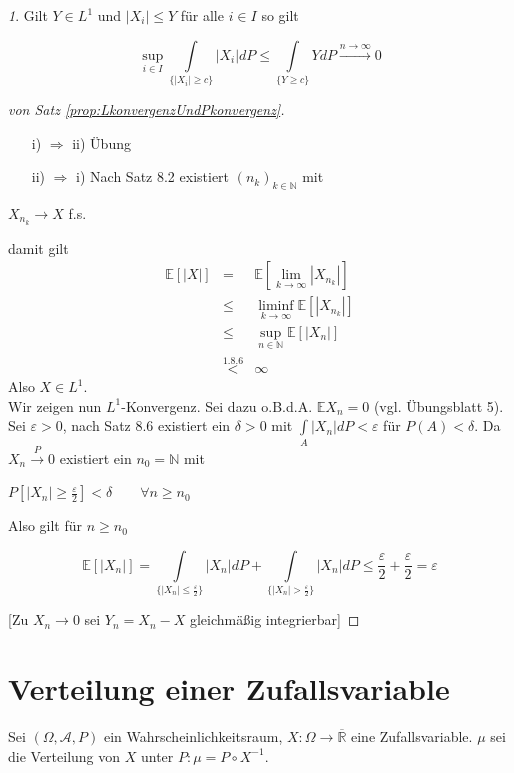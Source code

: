 \documentclass[10pt,a4paper]{report}
\newcommand{\E}{\mathbb{E}}
\newcommand{\N}{\mathbb{N}}
\newcommand{\R}{\mathbb{R}}
\numberwithin{equation}{section}
\numberwithin{figure}{section}
\theoremstyle{plain}
\theoremstyle{definition}
\theoremstyle{remark}
\newtheorem{rem}[thm]{\protect\remarkname}
\theoremstyle{plain}
\providecommand{\remarkname}{Bemerkung}
\newcommand{\1}{ \mathbb{1} } %
\begin{document}
\begin{rem}
  Gilt $Y \in L^1$ und $|X_i| \leq Y$ für alle $i \in I$ so gilt
  \begin{center}
    \[\sup\limits_{i \in I} \int\limits_{\{|X_i|\geq c\}}|X_i|dP \leq
    \int\limits_{\{Y \geq c\}}Y dP \overset{n \to \infty}{\to} 0 \]
  \end{center}
\end{rem}
\begin{proof}[von Satz \ref{prop:LkonvergenzUndPkonvergenz}]
  \begin{itemize}
  \item[i) $\Rightarrow$ ii)] Übung
  \item[ii) $\Rightarrow$ i)] Nach Satz 8.2
    existiert $(n_k)_{k \in \N}$ mit
  \end{itemize}
  \begin{center}
    $X_{n_k} \to X$ f.s.
  \end{center}
  damit gilt
  \begin{eqnarray*}
    \E[|X|]&=&\E[\lim\limits_{k \to \infty} |X_{n_k}|]\\
    &\leq & \liminf\limits_{k \to \infty} \E[|X_{n_k}|]\\
    &\leq & \sup\limits_{n \in \N} \E[|X_n|]\\
    &\overset{1.8.6}{<}&\infty
  \end{eqnarray*}
  Also $X \in L^1$.\\
  Wir zeigen nun $L^1$-Konvergenz. Sei dazu o.B.d.A. $\E X_n=0$ (vgl. Übungsblatt 5). Sei $\varepsilon >0$, nach Satz 8.6 existiert ein $\delta >0 $ mit $\int\limits_A|X_n|dP<\varepsilon$ für $P(A)<\delta$. Da $X_n \overset{P}{\to} 0$ existiert ein $n_0= \N$ mit
  \begin{center}
    $P[|X_n|\geq\frac{\varepsilon}{2}]< \delta \qquad \forall n \geq n_0$
  \end{center}
  Also gilt für $n \geq n_0$
  \begin{center}
    \[\E[|X_n|]=\int\limits_{\{|X_n|\leq \frac{\varepsilon}{2}\}}|X_n|dP+\int\limits_{\{|X_n|> \frac{\varepsilon}{2}\}}|X_n|dP\leq \frac{\varepsilon}{2}+\frac{\varepsilon}{2}=\varepsilon \]
  \end{center}
  [Zu $X_n \to 0$ sei $Y_n=X_n-X$ gleichmäßig integrierbar]
\end{proof}
\section{Verteilung einer Zufallsvariable}
Sei $(\Omega,\mathcal{A},P)$ ein Wahrscheinlichkeitsraum, $X:\Omega \to \overline{\R}$ eine Zufallsvariable. $\mu$ sei die Verteilung von $X$ unter $P: \mu=P\circ X^{-1}$.
\end{document}

